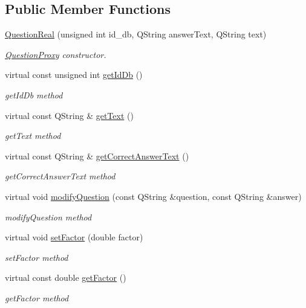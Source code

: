 \subsection*{Public Member Functions}
\begin{DoxyCompactItemize}
\item 
\hyperlink{class_question_real_aaa6521d727560d99784860c278cef633}{Question\+Real} (unsigned int id\+\_\+db, Q\+String answer\+Text, Q\+String text)
\begin{DoxyCompactList}\small\item\em \hyperlink{class_question_proxy}{Question\+Proxy} constructor. \end{DoxyCompactList}\item 
virtual const unsigned int \hyperlink{class_question_real_abc9b0cc639161eb99a2c256c4b8579ed}{get\+Id\+Db} ()
\begin{DoxyCompactList}\small\item\em get\+Id\+Db method \end{DoxyCompactList}\item 
virtual const Q\+String \& \hyperlink{class_question_real_aeeecdcaca7e7c3dd1d29794a662b2af1}{get\+Text} ()
\begin{DoxyCompactList}\small\item\em get\+Text method \end{DoxyCompactList}\item 
virtual const Q\+String \& \hyperlink{class_question_real_aa77cc2b576c35927d17af97f00ccf116}{get\+Correct\+Answer\+Text} ()
\begin{DoxyCompactList}\small\item\em get\+Correct\+Answer\+Text method \end{DoxyCompactList}\item 
virtual void \hyperlink{class_question_real_a771a990ea4f4e91574bc2cc5ec101ab5}{modify\+Question} (const Q\+String \&question, const Q\+String \&answer)
\begin{DoxyCompactList}\small\item\em modify\+Question method \end{DoxyCompactList}\item 
virtual void \hyperlink{class_question_real_a3c023bd8ecbba7ad59620e2216f0705a}{set\+Factor} (double factor)
\begin{DoxyCompactList}\small\item\em set\+Factor method \end{DoxyCompactList}\item 
virtual const double \hyperlink{class_question_real_a85fa2fc7e14e9017e9dd9329aeb331ff}{get\+Factor} ()
\begin{DoxyCompactList}\small\item\em get\+Factor method \end{DoxyCompactList}\end{DoxyCompactItemize}


